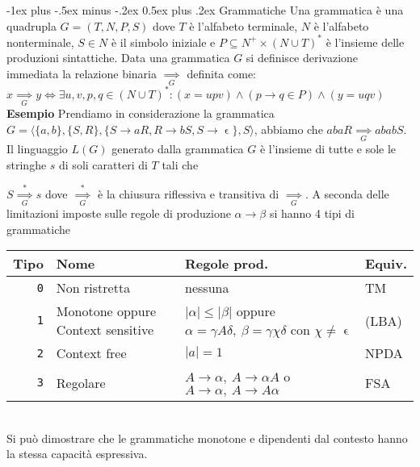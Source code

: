 \documentclass[10pt,landscape]{article}
\makeatletter
\renewcommand{\section}{\@startsection{section}{1}{0mm}%
                                {-1ex plus -.5ex minus -.2ex}%
                                {0.5ex plus .2ex}%
                                {\normalfont\Large\bfseries}}
\makeatother
\begin{document}
\begin{multicols*}{4}
        \section{Grammatiche}
        Una grammatica è una quadrupla $G=(T, N, P, S)$ dove $T$ è l'alfabeto terminale, $N$ è l'alfabeto nonterminale, $S \in N$ è il simbolo iniziale e $P \subseteq N^+ \times (N \cup T)^*$ è l'insieme delle produzioni sintattiche. Data una grammatica $G$ si definisce derivazione immediata
        la relazione binaria $\underset{G}{\implies}$ definita come: $x \underset{G}{\implies}y \iff \exists u,v,p,q \in (N \cup T)^*:(x=upv) \land (p \rightarrow q \in P) \land (y=uqv)$ \\ \textbf{Esempio} Prendiamo in considerazione la grammatica $G = \langle \{a,b\}, \{S,R\}, \{S \rightarrow aR,R \rightarrow bS, S \rightarrow \upvarepsilon\}, S\rangle$, abbiamo che $abaR \underset{G}{\implies} ababS$. Il linguaggio $L(G)$ generato dalla grammatica $G$ è l'insieme di tutte e sole le stringhe $s$ di soli caratteri di $T$ tali che

        $S\underset{G}{\overset{*}{\implies}}s$ dove $\underset{G}{\overset{*}{\implies}}$ è la chiusura riflessiva e transitiva di $\underset{G}{\implies}$.
        A seconda delle limitazioni imposte sulle regole di produzione $\alpha \rightarrow \beta$ si hanno 4 tipi di grammatiche \\ [5pt]
        \begin{tabular}{@{}r m{2.5cm} m{2.6cm} l@{}}
                \textbf{Tipo} & \textbf{Nome}                     & \textbf{Regole prod.}                                                                                            & \textbf{Equiv.} \\ \hline
                \verb|0|      & Non ristretta                     & nessuna                                                                                                          & TM              \\ \hline
                \verb|1|      & Monotone oppure Context sensitive & $|\alpha| \leq |\beta|$ oppure $\alpha=\gamma A \delta,\ \beta=\gamma \chi \delta$ con $\chi \neq \upvarepsilon$ & (LBA)           \\ \hline
                \verb|2|      & Context free                      & $|a| = 1$                                                                                                        & NPDA            \\ \hline
                \verb|3|      & Regolare                          & $A \rightarrow \alpha,\ A \rightarrow \alpha A$ o $A \rightarrow \alpha,\ A \rightarrow A\alpha$                 & FSA             \\\hline
        \end{tabular}\\ [5pt]
        Si può dimostrare che le grammatiche monotone e dipendenti dal contesto hanno la stessa capacità espressiva.

\end{multicols*}
\end{document}
